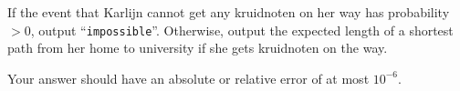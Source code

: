 

If the event that Karlijn cannot get any kruidnoten on her way has probability $> 0$, output ``\texttt{impossible}''.
Otherwise, output the expected length of a shortest path from her home to university if she gets kruidnoten on the way.

Your answer should have an absolute or relative error of at most $10^{-6}$.
